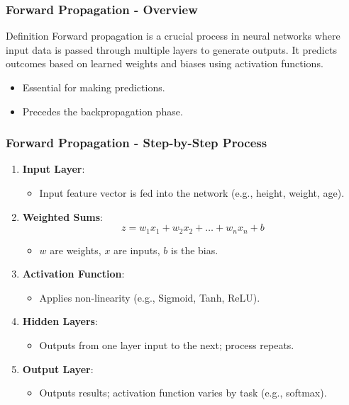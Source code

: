 \documentclass[aspectratio=169]{beamer}
\begin{document}
\begin{frame}[fragile]
  \frametitle{Forward Propagation - Overview}
  \begin{block}{Definition}
    Forward propagation is a crucial process in neural networks where input data is passed through multiple layers to generate outputs. It predicts outcomes based on learned weights and biases using activation functions.
  \end{block}
  
  \begin{itemize}
    \item Essential for making predictions.
    \item Precedes the backpropagation phase.
  \end{itemize}
\end{frame}

\begin{frame}[fragile]
  \frametitle{Forward Propagation - Step-by-Step Process}
  \begin{enumerate}
    \item \textbf{Input Layer}:
      \begin{itemize}
        \item Input feature vector is fed into the network (e.g., height, weight, age).
      \end{itemize}
    
    \item \textbf{Weighted Sums}:
      \begin{equation}
        z = w_1x_1 + w_2x_2 + \dots + w_nx_n + b
      \end{equation}
      \begin{itemize}
        \item \( w \) are weights, \( x \) are inputs, \( b \) is the bias.
      \end{itemize}
    
    \item \textbf{Activation Function}:
      \begin{itemize}
        \item Applies non-linearity (e.g., Sigmoid, Tanh, ReLU).
      \end{itemize}
    
    \item \textbf{Hidden Layers}:
      \begin{itemize}
        \item Outputs from one layer input to the next; process repeats.
      \end{itemize}
    
    \item \textbf{Output Layer}:
      \begin{itemize}
        \item Outputs results; activation function varies by task (e.g., softmax).
      \end{itemize}
  \end{enumerate}
\end{frame}
\end{document}
